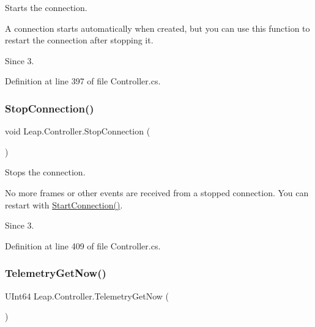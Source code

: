 Starts the connection. 

A connection starts automatically when created, but you can use this function to restart the connection after stopping it.

\begin{DoxySince}{Since}
3. 
\end{DoxySince}


Definition at line 397 of file Controller.\+cs.

\mbox{\label{class_leap_1_1_controller_a08c17e46012a2774afe1b5901e82ce6a}} 
\subsubsection{\texorpdfstring{StopConnection()}{StopConnection()}}
{\footnotesize\ttfamily void Leap.\+Controller.\+Stop\+Connection (\begin{DoxyParamCaption}{ }\end{DoxyParamCaption})}



Stops the connection. 

No more frames or other events are received from a stopped connection. You can restart with \mbox{\hyperlink{class_leap_1_1_controller_a3e1e2694a23c62c79f9592217529e860}{Start\+Connection()}}.

\begin{DoxySince}{Since}
3. 
\end{DoxySince}


Definition at line 409 of file Controller.\+cs.

\mbox{\label{class_leap_1_1_controller_a30f5d6dc2dfdce1cb56bcd8de049c38e}} 
\subsubsection{\texorpdfstring{TelemetryGetNow()}{TelemetryGetNow()}}
{\footnotesize\ttfamily U\+Int64 Leap.\+Controller.\+Telemetry\+Get\+Now (\begin{DoxyParamCaption}{ }\end{DoxyParamCaption})}



